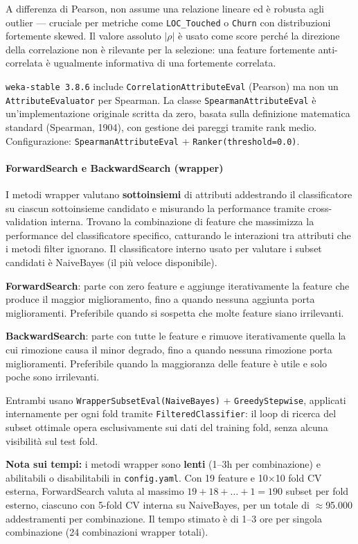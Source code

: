 A differenza di Pearson, non assume una relazione lineare ed è robusta agli outlier ---
cruciale per metriche come \texttt{LOC\_Touched} o \texttt{Churn} con distribuzioni
fortemente skewed. Il valore assoluto $|\rho|$ è usato come score perché la direzione
della correlazione non è rilevante per la selezione: una feature fortemente anti-correlata
è ugualmente informativa di una fortemente correlata.

\texttt{weka-stable 3.8.6} include \texttt{CorrelationAttributeEval} (Pearson) ma non un
\texttt{AttributeEvaluator} per Spearman. La classe \texttt{SpearmanAttributeEval} è
un'implementazione originale scritta da zero, basata sulla definizione matematica standard
(Spearman, 1904), con gestione dei pareggi tramite rank medio. Configurazione:
\texttt{SpearmanAttributeEval} + \texttt{Ranker(threshold=0.0)}.

\paragraph{ForwardSearch e BackwardSearch (wrapper)}

I metodi wrapper valutano \textbf{sottoinsiemi} di attributi addestrando il classificatore
su ciascun sottoinsieme candidato e misurando la performance tramite cross-validation
interna. Trovano la combinazione di feature che massimizza la performance del
classificatore specifico, catturando le interazioni tra attributi che i metodi filter
ignorano. Il classificatore interno usato per valutare i subset candidati è NaiveBayes
(il più veloce disponibile).

\textbf{ForwardSearch}: parte con zero feature e aggiunge iterativamente la feature che
produce il maggior miglioramento, fino a quando nessuna aggiunta porta miglioramenti.
Preferibile quando si sospetta che molte feature siano irrilevanti.

\textbf{BackwardSearch}: parte con tutte le feature e rimuove iterativamente quella la
cui rimozione causa il minor degrado, fino a quando nessuna rimozione porta miglioramenti.
Preferibile quando la maggioranza delle feature è utile e solo poche sono irrilevanti.

Entrambi usano \texttt{WrapperSubsetEval(NaiveBayes)} + \texttt{GreedyStepwise},
applicati internamente per ogni fold tramite \texttt{FilteredClassifier}: il loop di
ricerca del subset ottimale opera esclusivamente sui dati del training fold, senza alcuna
visibilità sul test fold.

\medskip
\noindent\textbf{Nota sui tempi:} i metodi wrapper sono \textbf{lenti} (1--3h per
combinazione) e abilitabili o disabilitabili in \texttt{config.yaml}. Con 19 feature e 10$\times$10 fold CV esterna, ForwardSearch
valuta al massimo $19 + 18 + \ldots + 1 = 190$ subset per fold esterno, ciascuno con
5-fold CV interna su NaiveBayes, per un totale di $\approx$95.000 addestramenti per
combinazione. Il tempo stimato è di 1--3 ore per singola combinazione (24 combinazioni
wrapper totali).

